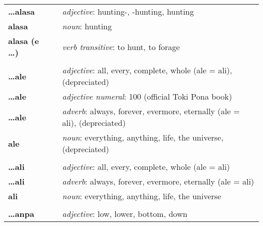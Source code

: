 \begin{supertabular}{p{2,5cm}|ll}
    \textbf{\dots alasa}         &  & \textit{adjective}: hunting-, -hunting, hunting                                                            \\
    \textbf{alasa}               &  & \textit{noun}: hunting                                                                                     \\
    \textbf{alasa (e \dots)}     &  & \textit{verb transitive}: to hunt, to forage                                                               \\
                                 &  &                                                                                                            \\
    \textbf{\dots ale}           &  & \textit{adjective}: all, every, complete, whole (ale = ali), (depreciated)                                 \\
    \textbf{\dots ale}           &  & \textit{adjective numeral}: 100 (official Toki Pona book)                                                  \\
    \textbf{\dots ale}           &  & \textit{adverb}: always, forever, evermore, eternally (ale = ali), (depreciated)                           \\
    \textbf{ale}                 &  & \textit{noun}: everything, anything, life, the universe, (depreciated)                                     \\
                                 &  &                                                                                                            \\
    \textbf{\dots ali}           &  & \textit{adjective}: all, every, complete, whole (ale = ali)                                                \\
    \textbf{\dots ali}           &  & \textit{adverb}: always, forever, evermore, eternally (ale = ali)                                          \\
    \textbf{ali}                 &  & \textit{noun}: everything, anything, life, the universe                                                    \\
                                 &  &                                                                                                            \\
    \textbf{\dots anpa}          &  & \textit{adjective}: low, lower, bottom, down                                                               \\

\end{supertabular}
